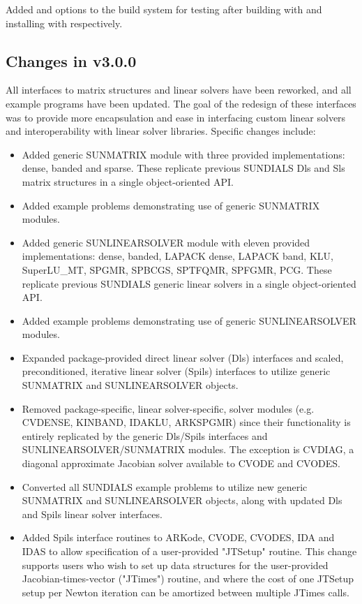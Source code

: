 Added  and  options to the build
system for testing {\sundials} after building with  and
installing with  respectively.

\subsection*{Changes in v3.0.0}

All interfaces to matrix structures and linear solvers 
have been reworked, and all example programs have been updated. 
The goal of the redesign of these interfaces was to provide more encapsulation
and ease in interfacing custom linear solvers and interoperability 
with linear solver libraries.
Specific changes include:
\begin{itemize}
\item Added generic SUNMATRIX module with three provided implementations:
        dense, banded and sparse.  These replicate previous SUNDIALS Dls and
        Sls matrix structures in a single object-oriented API.
\item Added example problems demonstrating use of generic SUNMATRIX modules.
\item Added generic SUNLINEARSOLVER module with eleven provided
        implementations: dense, banded, LAPACK dense, LAPACK band, KLU,
        SuperLU\_MT, SPGMR, SPBCGS, SPTFQMR, SPFGMR, PCG.  These replicate
        previous SUNDIALS generic linear solvers in a single object-oriented
        API.
\item Added example problems demonstrating use of generic SUNLINEARSOLVER
        modules.
\item Expanded package-provided direct linear solver (Dls) interfaces and
        scaled, preconditioned, iterative linear solver (Spils) interfaces
        to utilize generic SUNMATRIX and SUNLINEARSOLVER objects.
\item Removed package-specific, linear solver-specific, solver modules
        (e.g. CVDENSE, KINBAND, IDAKLU, ARKSPGMR) since their functionality
        is entirely replicated by the generic Dls/Spils interfaces and
        SUNLINEARSOLVER/SUNMATRIX modules.  The exception is CVDIAG, a
        diagonal approximate Jacobian solver available to CVODE and CVODES.
\item Converted all SUNDIALS example problems to utilize new generic
        SUNMATRIX and SUNLINEARSOLVER objects, along with updated Dls and
        Spils linear solver interfaces.
\item Added Spils interface routines to ARKode, CVODE, CVODES, IDA and
        IDAS to allow specification of a user-provided "JTSetup" routine.
        This change supports users who wish to set up data structures for
        the user-provided Jacobian-times-vector ("JTimes") routine, and
        where the cost of one JTSetup setup per Newton iteration can be
        amortized between multiple JTimes calls.
\end{itemize}

